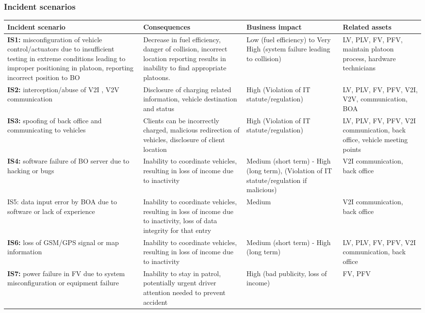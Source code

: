 \documentclass[british,11pt,a4paper]{article}
\begin{document}
\subsubsection{Incident scenarios}
\begin{table}[]
\centering
\begin{tabular}{|p{4cm}|p{4cm}|p{3cm}|p{3cm}|}
\hline
\textbf{Incident scenario} & \textbf{Consequences} & \textbf{Business impact} & \textbf{Related assets} \\ \hline
\textbf{IS1:} misconfiguration of vehicle control/actuators due to insufficient testing in extreme conditions leading to improper positioning in platoon, reporting incorrect position to BO & Decrease in fuel efficiency, danger of collision, incorrect location reporting results in inability to find appropriate platoons. & Low (fuel efficiency) to Very High (system failure leading to collision) & LV, PLV, FV, PFV, maintain platoon process, hardware technicians \\ \hline
\textbf{IS2:} interception/abuse of V2I , V2V communication & Disclosure of charging related information, vehicle destination and status & High (Violation of IT statute/regulation) & LV, PLV, FV, PFV, V2I, V2V, communication, BOA \\ \hline
\textbf{IS3:} spoofing of back office and communicating to vehicles & Clients can be incorrectly charged, malicious redirection of vehicles, disclosure of client location & High (Violation of IT statute/regulation) & LV, PLV, FV, PFV, V2I communication, back office, vehicle meeting points \\ \hline
\textbf{IS4:} software failure of BO server due to hacking or bugs & Inability to coordinate vehicles, resulting in loss of income due to inactivity & Medium (short term) - High (long term), (Violation of IT statute/regulation if malicious) & V2I communication, back office \\ \hline
IS5: data input error by BOA due to software or lack of experience & Inability to coordinate vehicles, resulting in loss of income due to inactivity, loss of data integrity for that entry & Medium & V2I communication, back office \\ \hline
\textbf{IS6:} loss of GSM/GPS signal or map information & Inability to coordinate vehicles, resulting in loss of income due to inactivity & Medium (short term) - High (long term) & LV, PLV, FV, PFV, V2I communication, back office \\ \hline
\textbf{IS7:} power failure in FV due to system misconfiguration or equipment failure & Inability to stay in patrol, potentially urgent driver attention needed to prevent accident & High (bad publicity, loss of income) & FV, PFV \\ \hline

\end{tabular}
\end{table}
\end{document}
